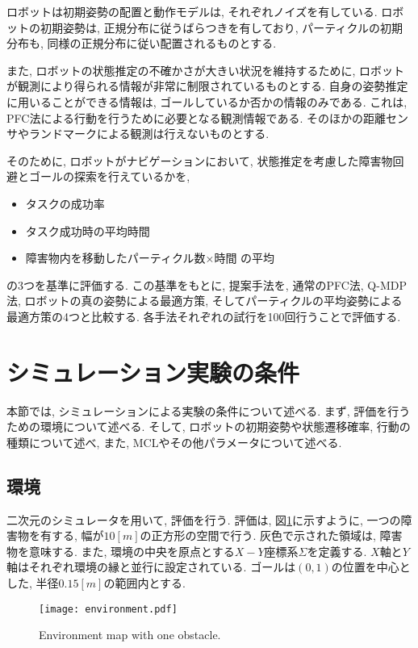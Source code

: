 ロボットは初期姿勢の配置と動作モデルは, それぞれノイズを有している. 
ロボットの初期姿勢は, 正規分布に従うばらつきを有しており, 
パーティクルの初期分布も, 同様の正規分布に従い配置されるものとする. 

また, ロボットの状態推定の不確かさが大きい状況を維持するために, 
ロボットが観測により得られる情報が非常に制限されているものとする. 
自身の姿勢推定に用いることができる情報は, ゴールしているか否かの情報のみである. 
これは, PFC法による行動を行うために必要となる観測情報である. 
そのほかの距離センサやランドマークによる観測は行えないものとする. 

そのために, ロボットがナビゲーションにおいて, 状態推定を考慮した障害物回避とゴールの探索を行えているかを, 
\begin{itemize}
  \item タスクの成功率
  \item タスク成功時の平均時間
  \item 障害物内を移動したパーティクル数×時間 の平均
\end{itemize}
の3つを基準に評価する. 
この基準をもとに, 提案手法を, 通常のPFC法, Q-MDP法, ロボットの真の姿勢による最適方策, 
そしてパーティクルの平均姿勢による最適方策の4つと比較する. 
各手法それぞれの試行を100回行うことで評価する. 


\section{シミュレーション実験の条件} \label{section:実験条件}
本節では, シミュレーションによる実験の条件について述べる. 
まず, 評価を行うための環境について述べる. 
そして, ロボットの初期姿勢や状態遷移確率, 行動の種類について述べ, また, MCLやその他パラメータについて述べる. 

\subsection{環境}
二次元のシミュレータを用いて, 評価を行う. 
評価は, 図\ref{fig:environment}に示すように, 一つの障害物を有する, 幅が$10[\si{m}]$の正方形の空間で行う. 
灰色で示された領域は, 障害物を意味する. 
また, 環境の中央を原点とする$X-Y$座標系$\Sigma$を定義する. 
$X$軸と$Y$軸はそれぞれ環境の縁と並行に設定されている. 
ゴールは$(0, 1)$の位置を中心とした, 半径$0.15[\si{m}]$の範囲内とする. 
\begin{figure}[tbp]
  \begin{center}
    \texttt{[image: environment.pdf]}
    \caption{Environment map with one obstacle.}
    \label{fig:environment}
  \end{center}
\end{figure}


